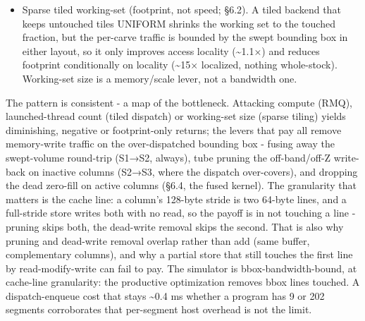 \documentclass[
]{article}
\begin{document}
\begin{itemize}
  measurably slower than tube pruning alone: the per-tile barriers
  serialize the tiles and the joins double-process columns, and that
  synchronization cost exceeds the thread-launch saving, because tube
  pruning already made the off-band threads cheap (a read, no write).
  Reverted. Neither branch survives in the current build, so neither is
  measured on the benchmark set of §5.2 and neither appears in the
  tables; we report the direction of both results, which is what the
  diagnosis rests on, rather than figures from a configuration a reader
  could not reproduce.
\item
  Sparse tiled working-set (footprint, not speed; §6.2). A tiled backend
  that keeps untouched tiles UNIFORM shrinks the working set to the
  touched fraction, but the per-carve traffic is bounded by the swept
  bounding box in either layout, so it only improves access locality
  (\textasciitilde1.1×) and reduces footprint conditionally on locality
  (\textasciitilde15× localized, nothing whole-stock). Working-set size
  is a memory/scale lever, not a bandwidth one.
\end{itemize}

The pattern is consistent - a map of the bottleneck. Attacking compute
(RMQ), launched-thread count (tiled dispatch) or working-set size
(sparse tiling) yields diminishing, negative or footprint-only returns;
the levers that pay all remove memory-write traffic on the
over-dispatched bounding box - fusing away the swept-volume round-trip
(S1→S2, always), tube pruning the off-band/off-Z write-back on inactive
columns (S2→S3, where the dispatch over-covers), and dropping the dead
zero-fill on active columns (§6.4, the fused kernel). The granularity
that matters is the cache line: a column's 128-byte stride is two
64-byte lines, and a full-stride store writes both with no read, so the
payoff is in not touching a line - pruning skips both, the dead-write
removal skips the second. That is also why pruning and dead-write
removal overlap rather than add (same buffer, complementary columns),
and why a partial store that still touches the first line by
read-modify-write can fail to pay. The simulator is
bbox-bandwidth-bound, at cache-line granularity: the productive
optimization removes bbox lines touched. A dispatch-enqueue cost that
stays \textasciitilde0.4 ms whether a program has 9 or 202 segments
corroborates that per-segment host overhead is not the limit.
\end{document}
